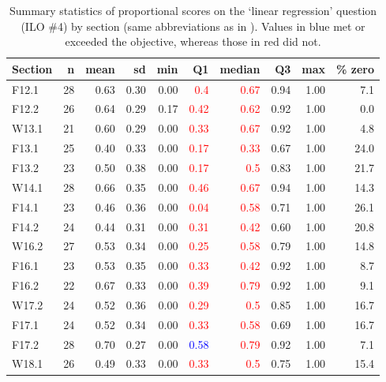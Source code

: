 \documentclass{article}\usepackage[]{graphicx}\usepackage[]{color}
\begin{document}
\begin{table}[h]
\centering
\caption{Summary statistics of proportional scores on the `linear regression' question (ILO \#4) by section (same abbreviations as in ). Values in blue met or exceeded the objective, whereas those in red did not.} 
\label{tab:sumReg}
\begin{tabular}{lrrrrrrrrr}
  \hline
Section & n & mean & sd & min & \textbf{Q1} & \textbf{median} & Q3 & max & \% zero \\ 
  \hline
F12.1 & 28 & 0.63 & 0.30 & 0.00 & \textcolor{red}{                    0.4} & \textcolor{red}{0.67} & 0.94 & 1.00 & 7.1 \\ 
  F12.2 & 26 & 0.64 & 0.29 & 0.17 & \textcolor{red}{                   0.42} & \textcolor{red}{0.62} & 0.92 & 1.00 & 0.0 \\ 
  W13.1 & 21 & 0.60 & 0.29 & 0.00 & \textcolor{red}{                   0.33} & \textcolor{red}{0.67} & 0.92 & 1.00 & 4.8 \\ 
  F13.1 & 25 & 0.40 & 0.33 & 0.00 & \textcolor{red}{                   0.17} & \textcolor{red}{0.33} & 0.67 & 1.00 & 24.0 \\ 
  F13.2 & 23 & 0.50 & 0.38 & 0.00 & \textcolor{red}{                   0.17} & \textcolor{red}{ 0.5} & 0.83 & 1.00 & 21.7 \\ 
  W14.1 & 28 & 0.66 & 0.35 & 0.00 & \textcolor{red}{                   0.46} & \textcolor{red}{0.67} & 0.94 & 1.00 & 14.3 \\ 
  F14.1 & 23 & 0.46 & 0.36 & 0.00 & \textcolor{red}{                   0.04} & \textcolor{red}{0.58} & 0.71 & 1.00 & 26.1 \\ 
  F14.2 & 24 & 0.44 & 0.31 & 0.00 & \textcolor{red}{                   0.31} & \textcolor{red}{0.42} & 0.60 & 1.00 & 20.8 \\ 
  W16.2 & 27 & 0.53 & 0.34 & 0.00 & \textcolor{red}{                   0.25} & \textcolor{red}{0.58} & 0.79 & 1.00 & 14.8 \\ 
  F16.1 & 23 & 0.53 & 0.35 & 0.00 & \textcolor{red}{                   0.33} & \textcolor{red}{0.42} & 0.92 & 1.00 & 8.7 \\ 
  F16.2 & 22 & 0.67 & 0.33 & 0.00 & \textcolor{red}{                   0.39} & \textcolor{red}{0.79} & 0.92 & 1.00 & 9.1 \\ 
  W17.2 & 24 & 0.52 & 0.36 & 0.00 & \textcolor{red}{                   0.29} & \textcolor{red}{ 0.5} & 0.85 & 1.00 & 16.7 \\ 
  F17.1 & 24 & 0.52 & 0.34 & 0.00 & \textcolor{red}{                   0.33} & \textcolor{red}{0.58} & 0.69 & 1.00 & 16.7 \\ 
  F17.2 & 28 & 0.70 & 0.27 & 0.00 & \textcolor{red}{\textcolor{blue}{0.58}} & \textcolor{red}{0.79} & 0.92 & 1.00 & 7.1 \\ 
  W18.1 & 26 & 0.49 & 0.33 & 0.00 & \textcolor{red}{                   0.33} & \textcolor{red}{ 0.5} & 0.75 & 1.00 & 15.4 \\ 
   \hline
\end{tabular}
\end{table}
\end{document}
